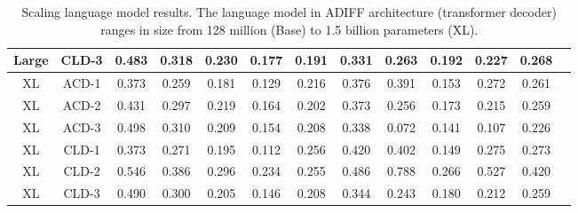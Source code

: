 \begin{table*}[!ht]
\begin{tabular}{ccccccccccccc}
Large & CLD-3 & 0.483 & 0.318 & 0.230 & 0.177 & 0.191 & 0.331 & 0.263 & 0.192 & 0.227 & 0.268 \\ \midrule
XL & ACD-1 & 0.373 & 0.259 & 0.181 & 0.129 & 0.216 & 0.376 & 0.391 & 0.153 & 0.272 & 0.261 \\
XL & ACD-2 & 0.431 & 0.297 & 0.219 & 0.164 & 0.202 & 0.373 & 0.256 & 0.173 & 0.215 & 0.259 \\
XL & ACD-3 & 0.498 & 0.310 & 0.209 & 0.154 & 0.208 & 0.338 & 0.072 & 0.141 & 0.107 & 0.226 \\
XL & CLD-1 & 0.373 & 0.271 & 0.195 & 0.112 & 0.256 & 0.420 & 0.402 & 0.149 & 0.275 & 0.273 \\
XL & CLD-2 & 0.546 & 0.386 & 0.296 & 0.234 & 0.255 & 0.486 & 0.788 & 0.266 & 0.527 & 0.420 \\
XL & CLD-3 & 0.490 & 0.300 & 0.205 & 0.146 & 0.208 & 0.344 & 0.243 & 0.180 & 0.212 & 0.259 \\ \bottomrule
\end{tabular} 
\caption{\small \label{table: appendix scale language model} Scaling language model results. The language model in ADIFF architecture (transformer decoder) ranges in size from 128 million (Base) to 1.5 billion parameters (XL). 
}  
\end{table*}

